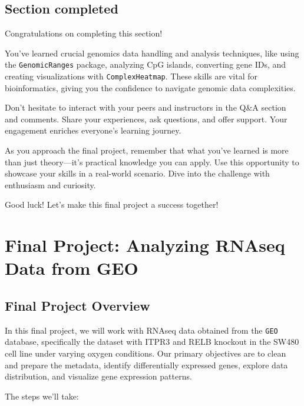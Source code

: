 \documentclass[
]{book}
\begin{document}
\hypertarget{section-completed}{%
\section{Section completed}\label{section-completed}}

Congratulations on completing this section!

You've learned crucial genomics data handling and analysis techniques, like using the \texttt{GenomicRanges} package, analyzing CpG islands, converting gene IDs, and creating visualizations with \texttt{ComplexHeatmap}. These skills are vital for bioinformatics, giving you the confidence to navigate genomic data complexities.

Don't hesitate to interact with your peers and instructors in the Q\&A section and comments. Share your experiences, ask questions, and offer support. Your engagement enriches everyone's learning journey.

As you approach the final project, remember that what you've learned is more than just theory---it's practical knowledge you can apply. Use this opportunity to showcase your skills in a real-world scenario. Dive into the challenge with enthusiasm and curiosity.

Good luck!
Let's make this final project a success together!

\hypertarget{final-project-analyzing-rnaseq-data-from-geo}{%
\chapter{Final Project: Analyzing RNAseq Data from GEO}\label{final-project-analyzing-rnaseq-data-from-geo}}

\hypertarget{final-project-overview}{%
\section{Final Project Overview}\label{final-project-overview}}

In this final project, we will work with RNAseq data obtained from the \texttt{GEO} database, specifically the dataset with ITPR3 and RELB knockout in the SW480 cell line under varying oxygen conditions. Our primary objectives are to clean and prepare the metadata, identify differentially expressed genes, explore data distribution, and visualize gene expression patterns.

The steps we'll take:
\end{document}
